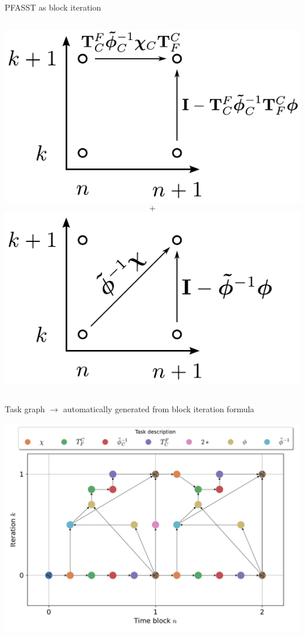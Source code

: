 \documentclass[11pt,aspectratio=43]{beamer}
\begin{document}
\begin{frame}{PFASST as block iteration}
\begin{columns}
		\centering
		\includegraphics[width=\linewidth]{kn-approxCGC.pdf}
		$$\textbf{+}$$
		\includegraphics[width=\linewidth]{kn-approxBlockJacobi.pdf}\vspace{-20pt}
	\end{columns}
\end{frame}

\begin{frame}{Task graph}
	$\rightarrow$ automatically generated from block iteration formula
	\begin{center}
    	\includegraphics[width=0.85\linewidth]{PFASSTTaskGraph.pdf}
    \end{center}
\end{frame}
\end{document}
